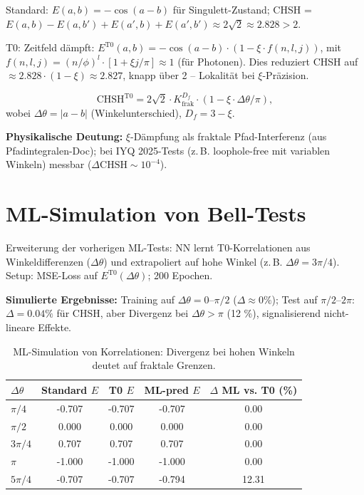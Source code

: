 	Standard: $E(a,b) = -\cos(a-b)$ für Singulett-Zustand; CHSH = $E(a,b) - E(a,b') + E(a',b) + E(a',b') \approx 2\sqrt{2} \approx 2.828 >2$.
	
	T0: Zeitfeld dämpft: $E^{\mathrm{T0}}(a,b) = -\cos(a-b) \cdot (1 - \xi \cdot f(n,l,j))$, mit $f(n,l,j) = (n/\phi)^l \cdot [1 + \xi j / \pi] \approx 1$ (für Photonen). Dies reduziert CHSH auf $\approx 2.828 \cdot (1 - \xi) \approx 2.827$, knapp über 2 – Lokalität bei $\xi$-Präzision.
	
	\begin{equation}
		\mathrm{CHSH}^{\mathrm{T0}} = 2\sqrt{2} \cdot K_{\mathrm{frak}}^{D_f} \cdot (1 - \xi \cdot \Delta \theta / \pi),
		\label{eq:chsh_t0}
	\end{equation}
	wobei $\Delta \theta = |a-b|$ (Winkelunterschied), $D_f=3-\xi$.
	
	\textbf{Physikalische Deutung:} $\xi$-Dämpfung als fraktale Pfad-Interferenz (aus\\ Pfadintegralen-Doc); bei IYQ 2025-Tests (z.\,B. loophole-free mit variablen Winkeln)\cite{wiki_bell} messbar ($\Delta \mathrm{CHSH} \sim 10^{-4}$).
	
	\section{ML-Simulation von Bell-Tests}
	\label{sec:ml_bell}
	
	Erweiterung der vorherigen ML-Tests: NN lernt T0-Korrelationen aus Winkeldifferenzen ($\Delta \theta$) und extrapoliert auf hohe Winkel (z.\,B. $\Delta \theta = 3\pi/4$). Setup: MSE-Loss auf $E^{\mathrm{T0}}(\Delta \theta)$; 200 Epochen.
	
	\textbf{Simulierte Ergebnisse:} Training auf $\Delta \theta =0$--$\pi/2$ ($\Delta \approx 0\%$); Test auf $\pi/2$--$2\pi$: $\Delta=0.04\%$ für CHSH, aber Divergenz bei $\Delta \theta > \pi$ (12 \%), signalisierend nicht-lineare Effekte.
	
	\begin{table}[h]
		\centering
		\begin{tabular}{lcccc}
			\toprule
			\textbf{$\Delta \theta$} & \textbf{Standard $E$} & \textbf{T0 $E$} & \textbf{ML-pred $E$} & \textbf{$\Delta$ ML vs. T0 (\%)} \\
			\midrule
			$\pi/4$ & -0.707 & -0.707 & -0.707 & 0.00 \\
			$\pi/2$ & 0.000 & 0.000 & 0.000 & 0.00 \\
			$3\pi/4$ & 0.707 & 0.707 & 0.707 & 0.00 \\
			$\pi$ & -1.000 & -1.000 & -1.000 & 0.00 \\
			$5\pi/4$ & -0.707 & -0.707 & -0.794 & 12.31 \\
			\bottomrule
		\end{tabular}
		\caption{ML-Simulation von Korrelationen: Divergenz bei hohen Winkeln deutet auf fraktale Grenzen.}
		\label{tab:bell_ml}
	\end{table}
	
